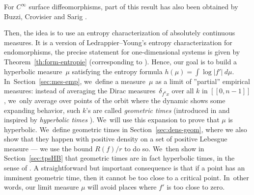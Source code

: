 \documentclass[JEP,XML,SOM,Unicode,NoFloatCountersInSection,published]{cedram}
\let\rC C
\theoremstyle{definition}
\begin{document}
For $\rC^{\infty}$ surface diffeomorphisms, part of this result has also been obtained by Buzzi, Crovisier and Sarig \cite{Buzzi_Crovisier_Sarig_2022}.

Then, the idea is to use an entropy characterization of absolutely continuous measures. It is a version of Ledrappier--Young's entropy characterization \cite{Ledrappier_Young_1985a,Ledrappier_Young_1985b} for endomorphisms, the precise statement for one-dimensional systems is given by Theorem~\ref{th:form-entropie} (corresponding to \cite[Th.\,VII.1.1]{SETE}).
Hence, our goal is to build a hyperbolic measure~$\mu$ satisfying the entropy formula $h(\mu) = \int \log |f'| \: d \mu$. In~Section~\ref{sec:mes-emp}, we~define a measure~$\mu$ as a limit of ''partial'' empirical measures: instead of averaging the Dirac measures~$\delta_{f^k x}$ over all $k$ in $[\![ 0, n-1 ]\!]$, we~only average over points of the orbit where the dynamic shows some expanding behavior, such $k$'s are called \textit{geometric times} (introduced in \cite{MR4701884} and inspired by \textit{hyperbolic times} \cite{Alves2000}). We~will use this expansion to prove that $\mu$ is hyperbolic. We~define geometric times in Section~\ref{sec:dens-geom}, where we also show that they happen with positive density on a set of positive Lebesgue measure --- we use the bound $R(f) / r$ to do so. We~then show in Section~\ref{sec:tpsHB} that geometric times are in fact hyperbolic times, in the sense of \cite{Alves2000}. A straightforward but important consequence is that if a point has an imminent geometric time, then it cannot be too close to a critical point. In~other words, our limit measure $\mu$ will avoid places where $f'$ is too close to zero.
\end{document}
